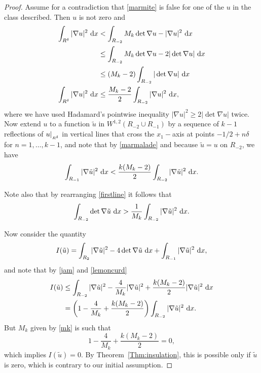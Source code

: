 \documentclass[12pt]{amsart}
\newcommand{\md}{{\rm d}}
\newcommand{\dx}{\, \md x}
\newcommand{\1}{{\bf 1}}
\begin{document}
\begin{proof}
    Assume for a contradiction that \eqref{marmite} is false for one of the $u$ in the class described.  Then $u$ is not zero and
    \begin{align}
   \label{firstline}    \int_{R^{\delta}} |\nabla u|^2 \, \dx & < \int_{R_{-2}} M_k \det \nabla u - |\nabla u|^2 \, \dx \\ \nonumber
       & \leq \int_{R_{-2}} M_k \det \nabla u - 2 |\det \nabla u| \, \dx \\ \nonumber
       & \leq  (M_k-2)\int_{R_{-2}} |\det \nabla u| \, \dx \\
\label{marmalade}     \int_{R^{\delta}} |\nabla u|^2 \, \dx  & \leq   \frac{M_k-2}{2}\int_{R_{-2}} |\nabla u|^2 \, \dx,
    \end{align}
where we have used Hadamard's pointwise inequality $|\nabla u|^2 \geq 2 |\det \nabla u|$ twice.  Now extend $u$ to a function $\tilde{u}$ in $W^{1,2}(R_{-2} \cup R_{-1})$ by a sequence of $k-1$ reflections of $u\arrowvert_{_{R^{\delta}}}$ in vertical lines that cross the $x_1-$axis at points $-1/2+n \delta$ for $n=1,\ldots,k-1$, and note that by \eqref{marmalade} and because $\tilde{u}=u$ on $R_{-2}$, we have
\begin{align}\label{jam}\int_{R_{-1}}|\nabla \tilde{u}|^2 \, \dx < \frac{k(M_k-2)}{2}\int_{R_{-2}} |\nabla \tilde{u}|^2 \, \dx. 
\end{align}

Note also that by rearranging \eqref{firstline} it follows that 
\begin{align}
    \label{lemoncurd} \int_{R_{-2}}\det \nabla \tilde{u} \, \dx > \frac{1}{M_k} \int_{R_{-2}} |\nabla \tilde{u}|^2 \, \dx. 
\end{align}

Now consider the quantity
$$I(\tilde{u})=\int_{R_2}|\nabla \tilde{u}|^2 - 4\det \nabla \tilde{u} \, \dx + \int_{R_{-1}} |\nabla \tilde{u}|^2 \, \dx,$$ 
and note that by \eqref{jam} and \eqref{lemoncurd}
\begin{align*}
  I(\tilde{u}) & \leq \int_{R_{-2}} |\nabla \tilde{u}|^2 -\frac{4}{M_k}|\nabla \tilde{u}|^2 + \frac{k(M_k-2)}{2} |\nabla \tilde{u}|^2 \, \dx \\
  & = \left( 1 -\frac{4}{M_k} + \frac{k(M_k-2)}{2} \right)\int_{R_{-2}}|\nabla \tilde{u}|^2 \, \dx. 
\end{align*}
But $M_k$ given by \eqref{mk} is such that 
$$  1 -\frac{4}{M_k} + \frac{k(M_k-2)}{2} = 0,$$
which implies $I(\tilde{u})=0$.  By Theorem~\ref{Thm:insulation}, this is possible only if $\tilde{u}$ is zero, which is contrary to our initial assumption. 
\end{proof}
\end{document}
